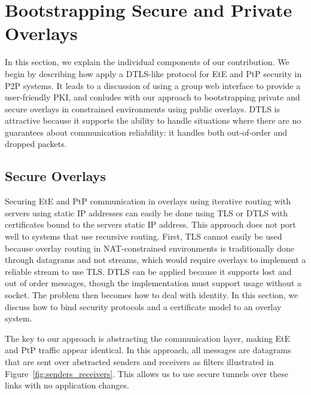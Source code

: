 \documentclass[conference]{IEEEtran}
\begin{document}
\section{Bootstrapping Secure and Private Overlays}
\label{contributions}
In this section, we explain the individual components of our contribution.  We
begin by describing how apply a DTLS-like protocol for EtE and PtP security in
P2P systems. It leads to a discussion of using a group web interface to
provide a user-friendly PKI, and conludes with our approach to bootstrapping
private and secure overlays in constrained environments using public overlays.
DTLS is attractive because it supports the ability to handle situations where
there are no guarantees about communication reliability: it handles both
out-of-order and dropped packets.


\subsection{Secure Overlays}
\label{secure_overlays}
Securing EtE and PtP communication in overlays using iterative routing with
servers using static IP addresses can easily be done using TLS or DTLS with
certificates bound to the servers static IP address.  This approach does not
port well to systems that use recursive routing. First, TLS cannot easily be used
because overlay routing in NAT-constrained environments is traditionally done through datagrams and not streams,
which would require overlays to implement a reliable stream to use TLS. 
DTLS can be applied because it supports lost and out of order messages, though
the implementation must support usage without a socket.  The
problem then becomes how to deal with identity.  In this section, we discuss how
to bind security protocols and a certificate model to an overlay system.

The key to our approach is abstracting the communication layer, making EtE and
PtP traffic appear identical. In this approach, all messages are datagrams that are sent
over abstracted senders and receivers as filters illustrated in
Figure~\ref{fig:senders_receivers}.  This allows us to use secure tunnels over
these links with no application changes.
\end{document}
